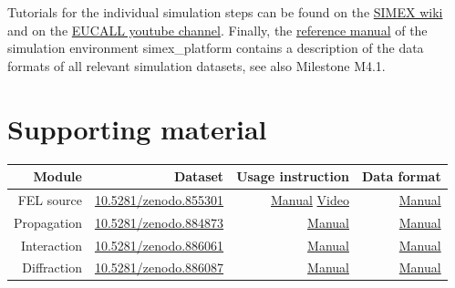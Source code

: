 \documentclass[12pt]{scrartcl}
\begin{document}
Tutorials for the individual simulation steps can be found on the
\href{https://www.github.com/eucall-software/simex_platform/wiki/SimEx-Tutorial}{SIMEX wiki} and
on the
\href{https://www.youtube.com/eucall/}{EUCALL youtube channel}.
Finally, the \href{https://eucall-software.github.io/simex_platform/}{reference manual} of the simulation environment simex\_platform
contains a description of the data formats of all relevant simulation datasets, see also
Milestone M4.1.

\section{Supporting material}
\begin{tabular}[ht]{|r|r|r|r|}
  \hline
  \textbf{Module}       & \textbf{Dataset}  &
  \textbf{Usage instruction}   & \textbf{Data format}       \\
  \hline
    FEL source &
    \href{https://dx.doi.org/10.5281/zenodo.855301}{10.5281/zenodo.855301} &
    \href{https://github.com/eucall-software/simex_platform/wiki/SimEx-Tutorial#prepating-the-source-input}{Manual}
    \href{https://youtu.be/Ql1p5-CLHug}{Video} &
    \href{https://eucall-software.github.io/simex_platform/#fel-source-calculations-fast}{Manual}
  \\
    Propagation &
    \href{https://dx.doi.org/10.5281/zenodo.884873}{10.5281/zenodo.884873} &
    \href{https://github.com/eucall-software/simex_platform/wiki/SimEx-Tutorial#beamline-propagation}{Manual} &
    \href{https://eucall-software.github.io/simex_platform/#coherent-wavefront-propagation-wpg-srw}{Manual}
  \\
    Interaction &
    \href{https://dx.doi.org/10.5281/zenodo.886061}{10.5281/zenodo.886061} &
    \href{https://github.com/eucall-software/simex_platform/wiki/SimEx-Tutorial#photon-matter-interaction}{Manual} &
    \href{https://eucall-software.github.io/simex_platform/#photon-matter-interaction-xmdyn}{Manual}
  \\
    Diffraction &
    \href{https://dx.doi.org/10.5281/zenodo.886087}{10.5281/zenodo.886087} &
    \href{https://github.com/eucall-software/simex_platform/wiki/SimEx-Tutorial#diffraction}{Manual} &
    \href{https://eucall-software.github.io/simex_platform/#diffraction-singfel}{Manual}
  \\
  \hline
\end{tabular}
%

\printbibliography[notkeyword=zenodo,notkeyword=tutorial, title={Articles}]
%
%
\end{document}
